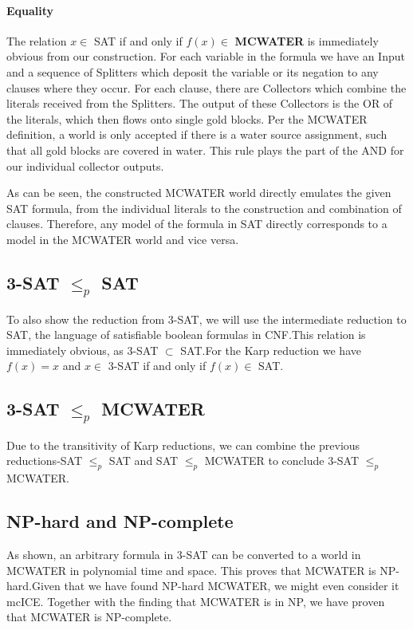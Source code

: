 \pagebreak

\paragraph{Equality}
The relation $x \in$ SAT if and only if $f(x) \in$ \textbf{MCWATER} is immediately obvious from our construction. For each variable in the formula we have an Input and a sequence of Splitters which deposit the variable or its negation to any clauses where they occur. For each clause, there are Collectors which combine the literals received from the Splitters. The output of these Collectors is the OR of the literals, which then flows onto single gold blocks. Per the MCWATER definition, a world is only accepted if there is a water source assignment, such that all gold blocks are covered in water. This rule plays the part of the AND for our individual collector outputs.
\linebreak

\noindent As can be seen, the constructed MCWATER world directly emulates the given SAT formula, from the individual literals to the construction and combination of clauses. Therefore, any model of the formula in SAT directly corresponds to a model in the MCWATER world and vice versa.



\subsection{3-SAT $\leq_p$ SAT}
To also show the reduction from 3-SAT, we will use the intermediate reduction to SAT, the language of satisfiable boolean formulas in CNF.\newline This relation is immediately obvious, as 3-SAT $\subset$ SAT.\newline For the Karp reduction we have $f(x) = x$ and $x \in$ 3-SAT if and only if $f(x) \in$ SAT.



\subsection{3-SAT $\leq_p$ MCWATER}
Due to the transitivity of Karp reductions, we can combine the previous reductions-SAT $\leq_p$ SAT and SAT $\leq_p$ MCWATER to conclude 3-SAT $\leq_p$ MCWATER.



\subsection{NP-hard and NP-complete}
As shown, an arbitrary formula in 3-SAT can be converted to a world in MCWATER in polynomial time and space. This proves that MCWATER is NP-hard.\newline Given that we have found NP-hard MCWATER, we might even consider it mcICE.
\linebreak
\noindent Together with the finding that MCWATER is in NP, we have proven that MCWATER is NP-complete.


